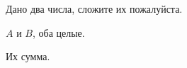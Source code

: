 Дано два числа, сложите их пожалуйста.

\InputFile

$A$ и $B$, оба целые.

\OutputFile

Их сумма.

\SAMPLES

